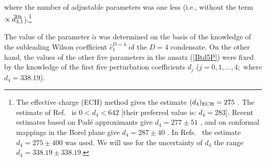 \documentclass[aps,nofootinbib,showkeys,noshowpacs,preprintnumbers,amsmath,amssymb]{revtex4}
\newcommand{\td}{{\widetilde d}}
\begin{document}
where the number of adjustable parameters was one less (i.e., without the term $\propto \td_{3,1}^{\rm IR}$).\footnote{The effective charge (ECH) method \cite{ECH} gives the estimate $(d_4)_{\rm ECH}=275$ \cite{KatStar,BCK}. The estimate of Ref.~\cite{BJ} is $0 < d_4 < 642$ [their preferred value is: $d_4=283$]. Recent estimates based on Pad\'e approximants give  $d_4=277 \pm 51$ \cite{Boitoetal}, and on conformal mappings in the Borel plane give $d_4=287 \pm 40$ \cite{Caprini2019}. In Refs.~\cite{Pich2,Pich} the estimate $d_4=275 \pm 400$ was used. We will use for the uncertainty of $d_4$ the range $d_4=338.19 \pm 338.19$.}

The value of the parameter ${\widetilde \alpha}$ was determined on the basis of the knowledge of the subleading Wilson coefficient ${\hat c}_1^{D=4}$ of the $D=4$ condensate. On the other hand, the values of the other five parameters in the ansatz (\ref{Btd5P}) were fixed by the knowledge of the first five perturbation coefficients $d_j$ ($j=0,1,\ldots,4;$ where $d_4=338.19$).
\end{document}
